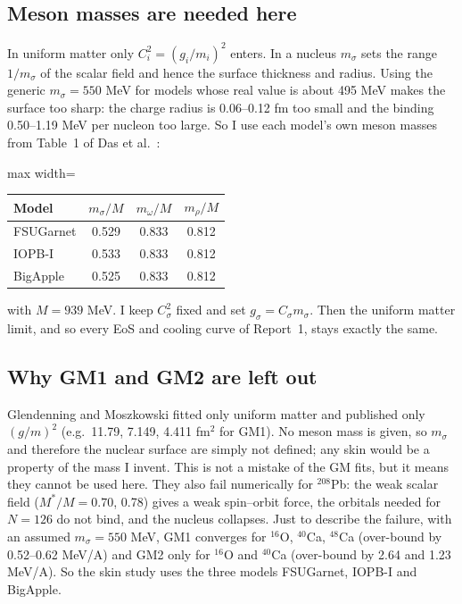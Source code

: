 \documentclass[11pt,a4paper]{article}
\begin{document}
\subsection{Meson masses are needed here}
In uniform matter only $C_i^2=(g_i/m_i)^2$ enters. In a nucleus $m_\sigma$ sets the range $1/m_\sigma$ of the scalar field and hence the surface thickness and radius. Using the generic $m_\sigma=550$ MeV for models whose real value is about 495 MeV makes the surface too sharp: the charge radius is 0.06--0.12 fm too small and the binding 0.50--1.19 MeV per nucleon too large. So I use each model's own meson masses from Table~1 of Das et al.\ \cite{Das2021}:
\begin{center}
\begin{adjustbox}{max width=\linewidth}
\begin{tabular}{lccc}
\toprule
Model & $m_\sigma/M$ & $m_\omega/M$ & $m_\rho/M$\\
\midrule
FSUGarnet & 0.529 & 0.833 & 0.812\\
IOPB-I & 0.533 & 0.833 & 0.812\\
BigApple & 0.525 & 0.833 & 0.812\\
\bottomrule
\end{tabular}
\end{adjustbox}
\end{center}
with $M=939$ MeV. I keep $C_\sigma^2$ fixed and set $g_\sigma=C_\sigma m_\sigma$. Then the uniform matter limit, and so every EoS and cooling curve of Report~1, stays exactly the same.

\subsection{Why GM1 and GM2 are left out}
Glendenning and Moszkowski \cite{GM1991} fitted only uniform matter and published only $(g/m)^2$ (e.g.\ 11.79, 7.149, 4.411 fm$^2$ for GM1). No meson mass is given, so $m_\sigma$ and therefore the nuclear surface are simply not defined; any skin would be a property of the mass I invent. This is not a mistake of the GM fits, but it means they cannot be used here. They also fail numerically for $^{208}$Pb: the weak scalar field ($M^*/M=0.70$, 0.78) gives a weak spin--orbit force, the orbitals needed for $N=126$ do not bind, and the nucleus collapses. Just to describe the failure, with an assumed $m_\sigma=550$ MeV, GM1 converges for $^{16}$O, $^{40}$Ca, $^{48}$Ca (over-bound by 0.52--0.62 MeV/A) and GM2 only for $^{16}$O and $^{40}$Ca (over-bound by 2.64 and 1.23 MeV/A). So the skin study uses the three models FSUGarnet, IOPB-I and BigApple.
\end{document}
